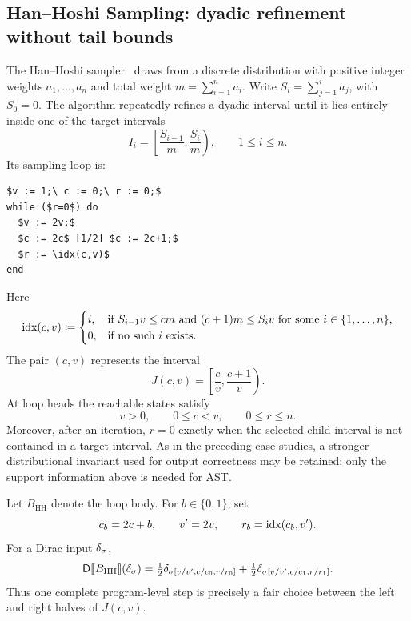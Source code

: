 \subsection{Han--Hoshi Sampling: dyadic refinement without tail bounds}
\label{sec:HanHoshi}

The Han--Hoshi sampler~\cite{HanHoshi1997} draws from a discrete distribution with positive
integer weights $a_1,\ldots,a_n$ and total weight
$m=\sum_{i=1}^n a_i$.  Write $S_i=\sum_{j=1}^i a_j$, with $S_0=0$.
The algorithm repeatedly refines a dyadic interval until it lies entirely
inside one of the target intervals
\[
 I_i=\left[\frac{S_{i-1}}m,\frac{S_i}m\right),
 \qquad 1\le i\le n.
\]
Its sampling loop is:
\begin{lstlisting}[basicstyle=\ttfamily\small,mathescape=true,frame=single]
$v := 1;\ c := 0;\ r := 0;$
while ($r=0$) do
  $v := 2v;$
  $c := 2c$ [1/2] $c := 2c+1;$
  $r := \idx(c,v)$
end
\end{lstlisting}
Here
\[
 \textnormal{idx}(c,v)
 \coloneqq
 \begin{cases}
 i,
 & \text{if }S_{i-1}v\le cm\text{ and }(c+1)m\le S_iv
   \text{ for some }i\in\{1,\ldots,n\},\\
 0,&\text{if no such }i\text{ exists}.
 \end{cases}
\]
The pair $(c,v)$ represents the interval
\[
 J(c,v)=\left[\frac cv,\frac{c+1}v\right).
\]
At loop heads the reachable states satisfy
\begin{equation}
 v>0,\qquad 0\le c<v,\qquad 0\le r\le n.
 \label{eq:han-hoshi-support}
\end{equation}
Moreover, after an iteration, $r=0$ exactly when the selected child
interval is not contained in a target interval.  As in the preceding case
studies, a stronger distributional invariant used for output correctness
may be retained; only the support information above is needed for AST.

Let $B_{\mathrm{HH}}$ denote the loop body.  For $b\in\{0,1\}$, set
\[
 c_b=2c+b,\qquad v'=2v,\qquad r_b=\textnormal{idx}(c_b,v').
\]
For a Dirac input $\delta_{\sigma}$,
\begin{equation}
 \mathsf{D}\llbracket B_{\mathrm{HH}}\rrbracket(\delta_{\sigma})
 =\tfrac12\delta_{\sigma[v/v',c/c_0,r/r_0]}
 +\tfrac12\delta_{\sigma[v/v',c/c_1,r/r_1]}.
 \label{eq:han-hoshi-post}
\end{equation}
Thus one complete program-level step is precisely a fair choice between
the left and right halves of $J(c,v)$.

